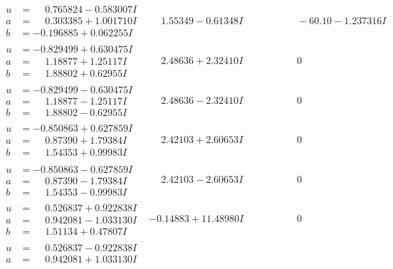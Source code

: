 \documentclass[1p]{elsarticle_modified}
\theoremstyle{definition}
\begin{document}
$$\begin{array}{c|c|c}
\begin{aligned}
u &= \phantom{-}0.765824 - 0.583007 I \\
a &= \phantom{-}0.303385 + 1.001710 I \\
b &= -0.196885 + 0.062255 I\end{aligned}
 & \phantom{-}1.55349 - 0.61348 I & \phantom{-0.000000 }      -6
0. 10   - 1.237316 I \\ \hline\begin{aligned}
u &= -0.829499 + 0.630475 I \\
a &= \phantom{-}1.18877 + 1.25117 I \\
b &= \phantom{-}1.88802 + 0.62955 I\end{aligned}
 & \phantom{-}2.48636 + 2.32410 I & \phantom{-0.000000 } 0 \\ \hline\begin{aligned}
u &= -0.829499 - 0.630475 I \\
a &= \phantom{-}1.18877 - 1.25117 I \\
b &= \phantom{-}1.88802 - 0.62955 I\end{aligned}
 & \phantom{-}2.48636 - 2.32410 I & \phantom{-0.000000 } 0 \\ \hline\begin{aligned}
u &= -0.850863 + 0.627859 I \\
a &= \phantom{-}0.87390 + 1.79384 I \\
b &= \phantom{-}1.54353 + 0.99983 I\end{aligned}
 & \phantom{-}2.42103 + 2.60653 I & \phantom{-0.000000 } 0 \\ \hline\begin{aligned}
u &= -0.850863 - 0.627859 I \\
a &= \phantom{-}0.87390 - 1.79384 I \\
b &= \phantom{-}1.54353 - 0.99983 I\end{aligned}
 & \phantom{-}2.42103 - 2.60653 I & \phantom{-0.000000 } 0 \\ \hline\begin{aligned}
u &= \phantom{-}0.526837 + 0.922838 I \\
a &= \phantom{-}0.942081 - 1.033130 I \\
b &= \phantom{-}1.51134 + 0.47807 I\end{aligned}
 & -0.14883 + 11.48980 I & \phantom{-0.000000 } 0 \\ \hline\begin{aligned}
u &= \phantom{-}0.526837 - 0.922838 I \\
a &= \phantom{-}0.942081 + 1.033130 I \\

\end{aligned}
\end{array}$$
\end{document}
